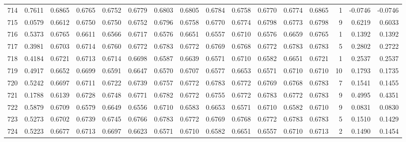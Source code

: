 \begin{tabular}{lrrrrrrrrrrrrrrr}
714 &      0.7611 &  0.6865 &  0.6765 &  0.6752 &  0.6779 &  0.6803 &  0.6805 &  0.6784 &  0.6758 &  0.6770 &   0.6774 &     0.6865 &      1 &                   -0.0746 &                    -0.0746 \\
715 &      0.0579 &  0.6612 &  0.6750 &  0.6750 &  0.6752 &  0.6796 &  0.6758 &  0.6770 &  0.6774 &  0.6798 &   0.6773 &     0.6798 &      9 &                    0.6219 &                     0.6033 \\
716 &      0.5373 &  0.6765 &  0.6611 &  0.6566 &  0.6717 &  0.6576 &  0.6651 &  0.6557 &  0.6710 &  0.6576 &   0.6659 &     0.6765 &      1 &                    0.1392 &                     0.1392 \\
717 &      0.3981 &  0.6703 &  0.6714 &  0.6760 &  0.6772 &  0.6783 &  0.6772 &  0.6769 &  0.6768 &  0.6772 &   0.6783 &     0.6783 &      5 &                    0.2802 &                     0.2722 \\
718 &      0.4184 &  0.6721 &  0.6713 &  0.6714 &  0.6698 &  0.6587 &  0.6639 &  0.6571 &  0.6710 &  0.6582 &   0.6651 &     0.6721 &      1 &                    0.2537 &                     0.2537 \\
719 &      0.4917 &  0.6652 &  0.6699 &  0.6591 &  0.6647 &  0.6570 &  0.6707 &  0.6577 &  0.6653 &  0.6571 &   0.6710 &     0.6710 &     10 &                    0.1793 &                     0.1735 \\
720 &      0.5242 &  0.6697 &  0.6711 &  0.6722 &  0.6739 &  0.6757 &  0.6772 &  0.6783 &  0.6772 &  0.6769 &   0.6768 &     0.6783 &      7 &                    0.1541 &                     0.1455 \\
721 &      0.1788 &  0.6139 &  0.6728 &  0.6748 &  0.6771 &  0.6782 &  0.6772 &  0.6755 &  0.6772 &  0.6783 &   0.6772 &     0.6783 &      9 &                    0.4995 &                     0.4351 \\
722 &      0.5879 &  0.6709 &  0.6579 &  0.6649 &  0.6556 &  0.6710 &  0.6583 &  0.6653 &  0.6571 &  0.6710 &   0.6582 &     0.6710 &      9 &                    0.0831 &                     0.0830 \\
723 &      0.5273 &  0.6702 &  0.6739 &  0.6745 &  0.6766 &  0.6783 &  0.6772 &  0.6769 &  0.6768 &  0.6772 &   0.6783 &     0.6783 &      5 &                    0.1510 &                     0.1429 \\
724 &      0.5223 &  0.6677 &  0.6713 &  0.6697 &  0.6623 &  0.6571 &  0.6710 &  0.6582 &  0.6651 &  0.6557 &   0.6710 &     0.6713 &      2 &                    0.1490 &                     0.1454 \\

\end{tabular}
